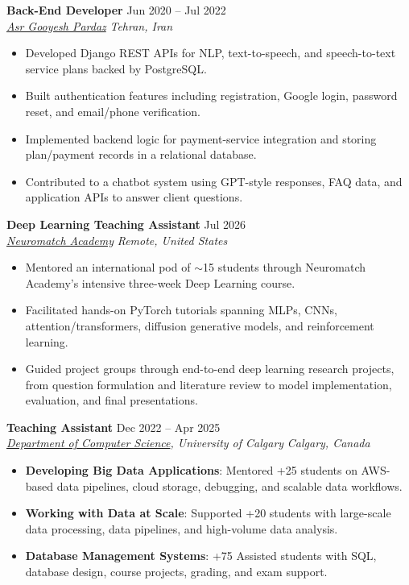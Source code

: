\documentclass[a4paper,10pt]{article}
\newcommand{\resumeSubheading}[4]{
    \textbf{#1} \hfill #2 \\
    \textit{#3} \hfill \textit{#4}
}
\begin{document}
\resumeSubheading
{Back-End Developer}
{Jun 2020 -- Jul 2022}
{\href{https://asr-gooyesh.com/en/}{Asr Gooyesh Pardaz}}
{Tehran, Iran}
\begin{itemize}[leftmargin=0.25in]
    \item Developed Django REST APIs for NLP, text-to-speech, and speech-to-text service plans backed by PostgreSQL.
    \item Built authentication features including registration, Google login, password reset, and email/phone verification.
    \item Implemented backend logic for payment-service integration and storing plan/payment records in a relational database.
    \item Contributed to a chatbot system using GPT-style responses, FAQ data, and application APIs to answer client questions.
\end{itemize}

\resumeSubheading
{Deep Learning Teaching Assistant}
{Jul 2026}
{\href{https://neuromatch.io/}{Neuromatch Academy}}
{Remote, United States}
\begin{itemize}[leftmargin=0.25in]
    \item Mentored an international pod of $\sim$15 students through Neuromatch Academy's intensive three-week Deep Learning course.
    \item Facilitated hands-on PyTorch tutorials spanning MLPs, CNNs, attention/transformers, diffusion generative models, and reinforcement learning.
    \item Guided project groups through end-to-end deep learning research projects, from question formulation and literature review to model implementation, evaluation, and final presentations.
\end{itemize}

\resumeSubheading
{Teaching Assistant}
{Dec 2022 -- Apr 2025}
{\href{https://science.ucalgary.ca/computer-science} {Department of Computer Science}, University of Calgary}
{Calgary, Canada}
\begin{itemize}[leftmargin=0.25in]
    \item \textbf{Developing Big Data Applications}: Mentored +25 students on AWS-based data pipelines, cloud storage, debugging, and scalable data workflows. 
    \item \textbf{Working with Data at Scale}: Supported +20 students with large-scale data processing, data pipelines, and high-volume data analysis. 
    \item \textbf{Database Management Systems}: +75 Assisted students with SQL, database design, course projects, grading, and exam support.
\end{itemize}
\end{document}
